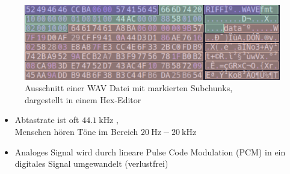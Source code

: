 \begin{frame}{\insertsection}
	\begin{figure}
		\includegraphics[scale=0.15]{images/wav_hex.png}
		\caption{\centering Ausschnitt einer WAV Datei mit markierten Subchunks,\\dargestellt in einem Hex-Editor}
	\end{figure}
	\begin{itemize}
		\item Abtastrate ist oft $\SI{44.1}{\kilo\hertz}$ ,
		\\  Menschen hören Töne im Bereich $\SI{20}{\hertz}-\SI{20}{\kilo\hertz}$ 
		\item Analoges Signal wird durch lineare Pulse Code Modulation (PCM)  in ein digitales Signal umgewandelt (verlustfrei)
	\end{itemize}
\end{frame}